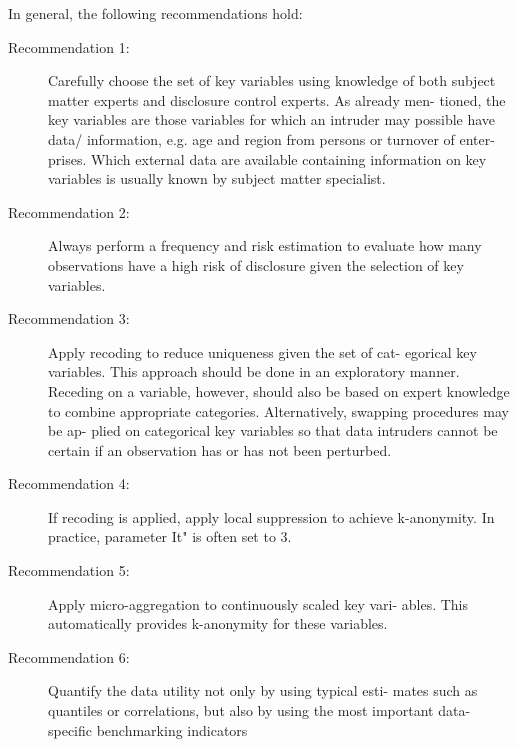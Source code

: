 \documentclass[]{article}
\title{}
\author{}
\begin{document}
In general, the following recommendations hold:
\begin{description}
\item[Recommendation 1:] Carefully choose the set of key variables using knowledge
of both subject matter experts and disclosure control experts. As already men-
tioned, the key variables are those variables for which an intruder may possible
have data/ information, e.g. age and region from persons or turnover of enter-
prises. Which external data are available containing information on key variables
is usually known by subject matter specialist.
\item[Recommendation 2:] Always perform a frequency and risk estimation to evaluate
how many observations have a high risk of disclosure given the selection of key
variables.
\item[Recommendation 3:] Apply recoding to reduce uniqueness given the set of cat-
egorical key variables. This approach should be done in an exploratory manner.
Receding on a variable, however, should also be based on expert knowledge to
combine appropriate categories. Alternatively, swapping procedures may be ap-
plied on categorical key variables so that data intruders cannot be certain if an
observation has or has not been perturbed.
\item[Recommendation 4:] If recoding is applied, apply local suppression to achieve
k-anonymity. In practice, parameter It" is often set to 3.
\item[Recommendation 5:] Apply micro-aggregation to continuously scaled key vari-
ables. This automatically provides k-anonymity for these variables.
\item[Recommendation 6:] Quantify the data utility not only by using typical esti-
mates such as quantiles or correlations, but also by using the most important
data-speciﬁc benchmarking indicators
\end{description}
\end{document}
